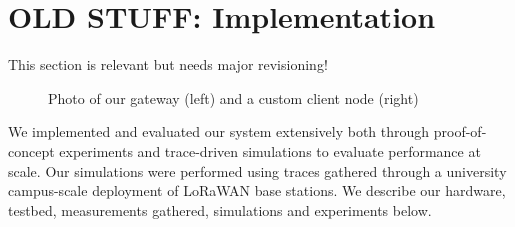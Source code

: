 \section{OLD STUFF: Implementation}
\label{sec:arch}

{\color{red} This section is relevant but needs major revisioning!}



\begin{figure}%
\centering
\compactimg
{}
\hfill
{}
\caption{Photo of our gateway (left) and a custom client node (right)}
\end{figure}



We implemented and evaluated our system extensively both through proof-of-concept experiments and trace-driven simulations to evaluate performance at scale. Our simulations were performed using traces gathered through a university campus-scale deployment of LoRaWAN base stations. We describe our hardware, testbed, measurements gathered, simulations and experiments below. 


